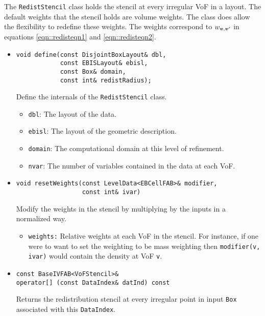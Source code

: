 The {\tt RedistStencil} class holds the stencil
at every irregular VoF in a layout.  The default weights
that the stencil holds are volume weights.  The class
does allow the flexibility to redefine these weights.
The weights correspond to $w_{{\boldsymbol{v}}, {\boldsymbol{v}}'}$ in 
equations \ref{eqn::redisteqn1} and \ref{eqn::redisteqn2}.
\begin{itemize}
\item \begin{small}\begin{verbatim}
void define(const DisjointBoxLayout& dbl,
            const EBISLayout& ebisl,
            const Box& domain,
            const int& redistRadius);        
\end{verbatim}\end{small}
Define the internals of the {\tt RedistStencil} class.
\begin{itemize}
\item {\tt dbl}: The layout of the data.
\item {\tt ebisl}: The layout of the geometric description.
\item{\tt domain}: The computational domain at this level of refinement.
\item {\tt nvar}: The number of variables contained in the data
        at each VoF.
\end{itemize}

\item \begin{small}\begin{verbatim}
void resetWeights(const LevelData<EBCellFAB>& modifier,
                  const int& ivar)
\end{verbatim}\end{small}
Modify the weights in the stencil by multiplying by
the inputs in a normalized way.
\begin{itemize}
\item {\tt weights:}  Relative weights at each VoF in the
stencil.  For instance, if one were to want to set the 
weighting to be mass weighting then {\tt modifier(v, ivar)}
would contain the density at VoF {\tt v}.
\end{itemize}

\item \begin{small}\begin{verbatim}
const BaseIVFAB<VoFStencil>&
operator[] (const DataIndex& datInd) const
\end{verbatim}\end{small}
Returns the redistribution stencil at every irregular
point in input {\tt Box} associated with  this {\tt DataIndex}.
\end{itemize}

